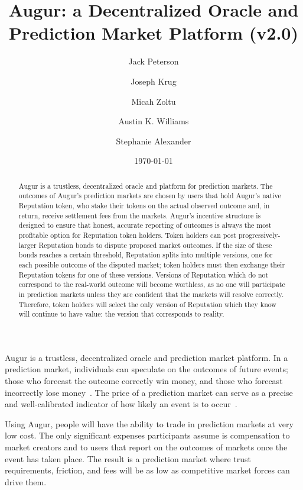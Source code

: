 \documentclass[floatfix,reprint,nofootinbib,amsmath,amssymb,epsfig,pre,floats,letterpaper,groupedaffiliation]{revtex4-1}
\theoremstyle{definition}
\theoremstyle{definition}
\begin{document}
\title{Augur: a Decentralized Oracle and Prediction Market Platform (v2.0)}

\author{Jack Peterson}
\author{Joseph Krug}
\author{Micah Zoltu}
\author{Austin K. Williams}
\author{Stephanie Alexander}

\date{\today}

\begin{abstract}
Augur is a trustless, decentralized oracle and platform for prediction markets.  The outcomes of Augur's prediction markets are chosen by users that hold Augur's native Reputation token, who stake their tokens on the actual observed outcome and, in return, receive settlement fees from the markets.  Augur's incentive structure is designed to ensure that honest, accurate reporting of outcomes is always the most profitable option for Reputation token holders.  Token holders can post progressively-larger Reputation bonds to dispute proposed market outcomes.  If the size of these bonds reaches a certain threshold, Reputation splits into multiple versions, one for each possible outcome of the disputed market; token holders must then exchange their Reputation tokens for one of these versions.  Versions of Reputation which do not correspond to the real-world outcome will become worthless, as no one will participate in prediction markets unless they are confident that the markets will resolve correctly.  Therefore, token holders will select the only version of Reputation which they know will continue to have value: the version that corresponds to reality.
\end{abstract}

\maketitle

Augur is a trustless, decentralized oracle and prediction market platform.  In a prediction market, individuals can speculate on the outcomes of future events; those who forecast the outcome correctly win money, and those who forecast incorrectly lose money~\cite{Wolfers_2004, Surowiecki_2005, Hanson_2006}.  The price of a prediction market can serve as a precise and well-calibrated indicator of how likely an event is to occur~\cite{Pennock_2001, Manski_2004, Wolfers_2005, Goel_2010}.

Using Augur, people will have the ability to trade in prediction markets at very low cost.  The only significant expenses participants assume is compensation to market creators and to users that report on the outcomes of markets once the event has taken place.  The result is a prediction market where trust requirements, friction, and fees will be as low as competitive market forces can drive them.
\end{document}
